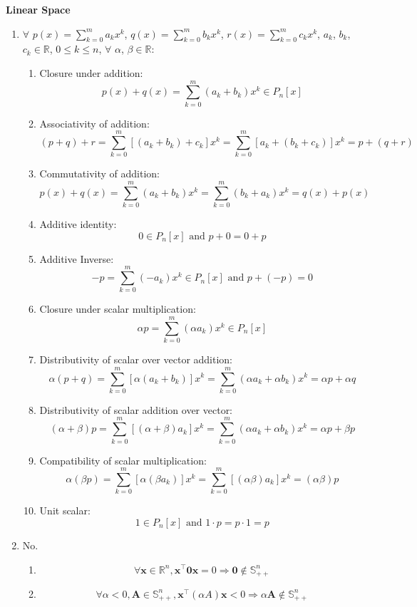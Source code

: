 \documentclass[11pt,letter,notitlepage]{article}
\theoremstyle{definition}
\begin{document}
\newpage

\begin{solution}\textbf{Linear Space}
	\begin{enumerate}
		\item
		$\forall$ $p(x) = \sum\limits_{k=0}^{m} a_k x^k$, $q(x) = \sum\limits_{k=0}^{m} b_k x^k$, $r(x) = \sum\limits_{k=0}^{m} c_k x^k$, $a_k$, $b_k$, $c_k\in \mathbb{R}$, $0 \leq k \leq n$, $\forall$ $\alpha$, $\beta \in \mathbb{R}$:
		\begin{enumerate}
			\item Closure under addition:
			\[
			p(x) + q(x) = \sum\limits_{k=0}^{m} (a_k + b_k) x^k \in P_n[x]
			\]
			\item Associativity of addition:
			\[
			(p + q) + r = \sum\limits_{k=0}^{m} [(a_k + b_k) + c_k] x^k = \sum\limits_{k=0}^{m} [a_k + (b_k + c_k)] x^k = p + (q + r)
			\]
			\item Commutativity of addition:
			\[
			p(x) + q(x) = \sum\limits_{k=0}^{m} (a_k + b_k) x^k = \sum\limits_{k=0}^{m} (b_k + a_k) x^k = q(x) + p(x)
			\]
			\item Additive identity:
			\[
			0\in P_n[x] \text{ and } p + 0 = 0 + p
			\]
			\item Additive Inverse:
			\[
			-p = \sum\limits_{k=0}^{m} (-a_k) x^k \in P_n[x] \text{ and } p + (-p) = 0
			\]
			\item Closure under scalar multiplication:
			\[
			\alpha p = \sum\limits_{k=0}^{m} (\alpha a_k) x^k \in P_n[x]
			\]
			\item Distributivity of scalar over vector addition:
			\[
			\alpha (p + q) = \sum\limits_{k=0}^{m} [\alpha (a_k + b_k)] x^k = \sum\limits_{k=0}^{m} (\alpha a_k + \alpha b_k) x^k = \alpha p + \alpha q
			\]
			\item Distributivity of scalar addition over vector:
			\[
			(\alpha + \beta) p = \sum\limits_{k=0}^{m} [(\alpha + \beta) a_k] x^k = \sum\limits_{k=0}^{m} (\alpha a_k + \alpha b_k) x^k = \alpha p + \beta p
			\]
			\item Compatibility of scalar multiplication:
			\[
			\alpha (\beta p) = \sum\limits_{k=0}^{m} [\alpha (\beta a_k)] x^k = \sum\limits_{k=0}^{m} [(\alpha \beta) a_k] x^k = (\alpha \beta) p
			\]
			\item Unit scalar:
			\[
			1\in P_n[x] \text{ and } 1 \cdot p = p \cdot 1 = p
			\]
		\end{enumerate}
		\item No.
		\begin{enumerate}
			\item 
			\[
			\forall \mathbf{x} \in \mathbb{R}^n, \mathbf{x^{\top}} \mathbf{0} \mathbf{x} = 0
			\Longrightarrow
			\mathbf{0} \not\in \mathbb{S}_{++}^{n}
			\]
			\item 
			\[
			\forall \alpha < 0, \mathbf{A} \in \mathbb{S}_{++}^{n},
			\mathbf{x^{\top}} (\alpha A) \mathbf{x}
			<
			0
			\Longrightarrow
			\alpha \mathbf{A} \not\in \mathbb{S}_{++}^{n}
			\]
		\end{enumerate}
	\end{enumerate}
\end{solution}
\end{document}

